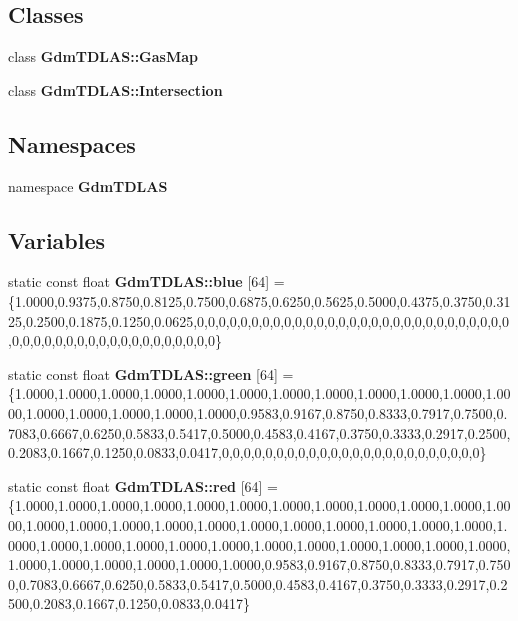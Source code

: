 \subsection*{Classes}
\begin{DoxyCompactItemize}
\item 
class {\bf GdmTDLAS::GasMap}
\item 
class {\bf GdmTDLAS::Intersection}
\end{DoxyCompactItemize}
\subsection*{Namespaces}
\begin{DoxyCompactItemize}
\item 
namespace {\bf GdmTDLAS}
\end{DoxyCompactItemize}
\subsection*{Variables}
\begin{DoxyCompactItemize}
\item 
static const float {\bf GdmTDLAS::blue} [64] = \{1.0000,0.9375,0.8750,0.8125,0.7500,0.6875,0.6250,0.5625,0.5000,0.4375,0.3750,0.3125,0.2500,0.1875,0.1250,0.0625,0,0,0,0,0,0,0,0,0,0,0,0,0,0,0,0,0,0,0,0,0,0,0,0,0,0,0,0,0,0,0,0,0,0,0,0,0,0,0,0,0,0,0,0,0,0,0,0\}
\item 
static const float {\bf GdmTDLAS::green} [64] = \{1.0000,1.0000,1.0000,1.0000,1.0000,1.0000,1.0000,1.0000,1.0000,1.0000,1.0000,1.0000,1.0000,1.0000,1.0000,1.0000,1.0000,0.9583,0.9167,0.8750,0.8333,0.7917,0.7500,0.7083,0.6667,0.6250,0.5833,0.5417,0.5000,0.4583,0.4167,0.3750,0.3333,0.2917,0.2500,0.2083,0.1667,0.1250,0.0833,0.0417,0,0,0,0,0,0,0,0,0,0,0,0,0,0,0,0,0,0,0,0,0,0,0,0\}
\item 
static const float {\bf GdmTDLAS::red} [64] = \{1.0000,1.0000,1.0000,1.0000,1.0000,1.0000,1.0000,1.0000,1.0000,1.0000,1.0000,1.0000,1.0000,1.0000,1.0000,1.0000,1.0000,1.0000,1.0000,1.0000,1.0000,1.0000,1.0000,1.0000,1.0000,1.0000,1.0000,1.0000,1.0000,1.0000,1.0000,1.0000,1.0000,1.0000,1.0000,1.0000,1.0000,1.0000,1.0000,1.0000,1.0000,0.9583,0.9167,0.8750,0.8333,0.7917,0.7500,0.7083,0.6667,0.6250,0.5833,0.5417,0.5000,0.4583,0.4167,0.3750,0.3333,0.2917,0.2500,0.2083,0.1667,0.1250,0.0833,0.0417\}
\end{DoxyCompactItemize}
